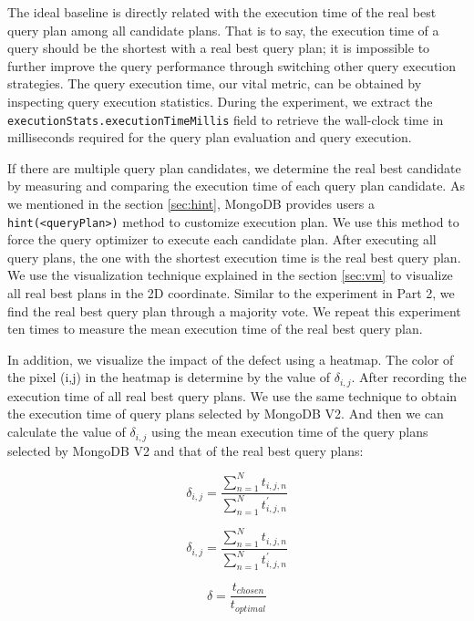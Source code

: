 The ideal baseline is directly related with the execution
time of the real best query plan among all candidate plans.
That is to say, the execution time of a query should be 
the shortest with a real best query plan; it is impossible
to further improve the query performance through switching
other query execution strategies. The query execution time,
our vital metric, can be obtained by inspecting query
execution statistics. During the experiment, we extract the \verb|executionStats.executionTimeMillis| field to retrieve
the wall-clock time in milliseconds required for the query 
plan evaluation and query execution.

If there are multiple query plan candidates, we determine
the real best candidate by measuring and comparing the 
execution time of each query plan candidate. As we mentioned
in the section \ref{sec:hint}, MongoDB provides users 
a \verb|hint(<queryPlan>)| method to customize execution 
plan. We use this method to force the query optimizer to 
execute each candidate plan. After executing all query plans,
the one with the shortest execution time is the real best 
query plan. We use the visualization technique explained in 
the section \ref{sec:vm} to visualize all real best plans in 
the 2D coordinate. Similar to the experiment in Part 2, we 
find the real best query plan through a majority vote. We 
repeat this experiment ten times to measure the mean execution
time of the real best query plan. 

In addition, we visualize the impact of the defect using 
a heatmap. The color of the pixel (i,j) in the heatmap is 
determine by the value of $\delta_{i,j}$. After recording
the execution time of all real best query plans. We use 
the same technique to obtain the execution time of query 
plans selected by MongoDB V2. And then we can calculate 
the value of $\delta_{i,j}$ using the mean execution time 
of the query plans selected by MongoDB V2 and that of the
real best query plans:

\begin{equation}
    \delta_{i,j} = \frac{\sum\limits_{n=1}^{N}t_{i,j,n}}{\sum\limits_{n=1}^{N}t_{i,j,n}^{'}}
\end{equation}

\begin{equation}
    \delta_{i,j} = \frac{\sum\limits_{n=1}^{N}t_{i,j,n}}{\sum\limits_{n=1}^{N}t_{i,j,n}^{'}}
\end{equation}

\begin{equation}
    \delta = \frac{t_{chosen}}{t_{optimal}}
\end{equation}

